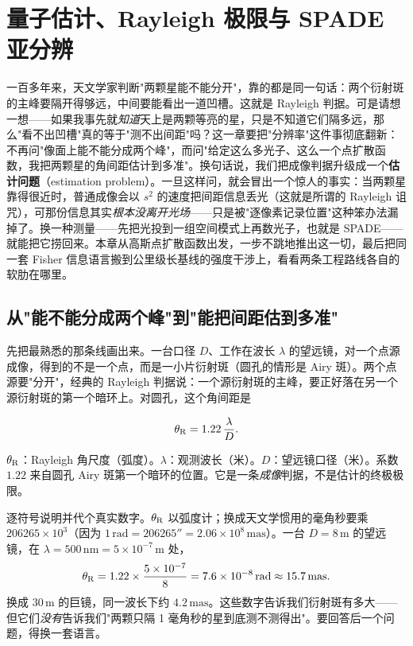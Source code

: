 \chapter{量子估计、Rayleigh 极限与 SPADE 亚分辨}
\label{chap:e12}

\begin{chapteropening}
一百多年来，天文学家判断"两颗星能不能分开"，靠的都是同一句话：两个衍射斑的主峰要隔开得够远，中间要能看出一道凹槽。这就是 Rayleigh 判据。可是请想一想——如果我事先就\emph{知道}天上是两颗等亮的星，只是不知道它们隔多远，那么"看不出凹槽"真的等于"测不出间距"吗？这一章要把"分辨率"这件事彻底翻新：不再问"像面上能不能分成两个峰"，而问"给定这么多光子、这么一个点扩散函数，我把两颗星的角间距估计到多准"。换句话说，我们把成像判据升级成一个\textbf{估计问题}（estimation problem）。一旦这样问，就会冒出一个惊人的事实：当两颗星靠得很近时，普通成像会以 \(s^2\) 的速度把间距信息丢光（这就是所谓的 Rayleigh 诅咒），可那份信息其实\emph{根本没离开光场}——只是被"逐像素记录位置"这种笨办法漏掉了。换一种测量——先把光投到一组空间模式上再数光子，也就是 SPADE——就能把它捞回来。本章从高斯点扩散函数出发，一步不跳地推出这一切，最后把同一套 Fisher 信息语言搬到公里级长基线的强度干涉上，看看两条工程路线各自的软肋在哪里。
\end{chapteropening}


\section{从"能不能分成两个峰"到"能把间距估到多准"}
\label{sec:e12-rayleigh}

先把最熟悉的那条线画出来。一台口径 \(D\)、工作在波长 \(\lambda\) 的望远镜，对一个点源成像，得到的不是一个点，而是一小片衍射斑（圆孔的情形是 Airy 斑）。两个点源要"分开"，经典的 Rayleigh 判据说：一个源衍射斑的主峰，要正好落在另一个源衍射斑的第一个暗环上。对圆孔，这个角间距是

\begin{equation}
  \theta_{\rm R}=1.22\,\frac{\lambda}{D}.
  \label{eq:e12-rayleigh}
\end{equation}
\begin{formulaexplain}
\(\theta_{\rm R}\)：Rayleigh 角尺度（弧度）。\(\lambda\)：观测波长（米）。\(D\)：望远镜口径（米）。系数 \(1.22\) 来自圆孔 Airy 斑第一个暗环的位置。它是一条\emph{成像}判据，不是估计的终极极限。
\end{formulaexplain}

逐符号说明并代个真实数字。\(\theta_{\rm R}\) 以弧度计；换成天文学惯用的毫角秒要乘 \(206265\times10^3\)（因为 \(1\,\mathrm{rad}=206265''=2.06\times10^{8}\,\mathrm{mas}\)）。一台 \(D=8\,\mathrm{m}\) 的望远镜，在 \(\lambda=500\,\mathrm{nm}=5\times10^{-7}\,\mathrm{m}\) 处，
\[
  \theta_{\rm R}=1.22\times\frac{5\times10^{-7}}{8}
  =7.6\times10^{-8}\,\mathrm{rad}
  \approx15.7\,\mathrm{mas}.
\]
换成 \(30\,\mathrm{m}\) 的巨镜，同一波长下约 \(4.2\,\mathrm{mas}\)。这些数字告诉我们衍射斑有多大——但它们\emph{没有}告诉我们"两颗只隔 1 毫角秒的星到底测不测得出"。要回答后一个问题，得换一套语言。

